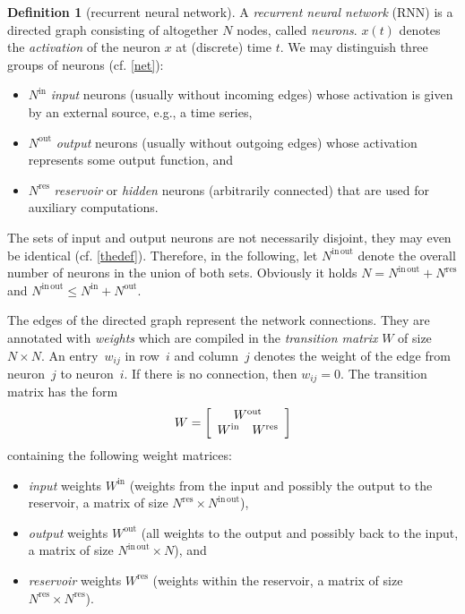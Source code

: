 \documentclass[twoside,11pt]{article}
\theoremstyle{definition}
\newtheorem{defn}{Definition}
\begin{document}
\begin{defn}[recurrent neural network]
A \emph{recurrent neural network} (RNN) is a directed graph consisting of
altogether $N$ nodes, called \emph{neurons}. $x(t)$ denotes the
\emph{activation} of the neuron $x$ at (discrete) time $t$. We may distinguish
three groups of neurons (cf. \cref{net}):
\begin{itemize}
  \item $N^\mathrm{in}$ \emph{input} neurons (usually without incoming edges)
	whose activation is given by an external source, e.g., a time series,
  \item $N^\mathrm{out}$ \emph{output} neurons (usually without outgoing edges)
	whose activation represents some output function, and
  \item $N^\mathrm{res}$ \emph{reservoir} or \emph{hidden} neurons (arbitrarily
	connected) that are used for auxiliary computations.
\end{itemize}
The sets of input and output neurons are not necessarily disjoint, they may even
be identical (cf. \cref{thedef}). Therefore, in the following, let
$N^\mathrm{in\,out}$ denote the overall number of neurons in the union of both
sets. Obviously it holds $N = N^\mathrm{in\,out}+N^\mathrm{res}$ and
$N^\mathrm{in\,out} \le N^\mathrm{in}+N^\mathrm{out}$.

The edges of the directed graph represent the network connections. They are
annotated with \emph{weights} which are compiled in the \emph{transition matrix}
$W$ of size $N \times N$. An entry~$w_{ij}$ in row~$i$ and column~$j$ denotes the weight of the edge
from neuron~$j$ to neuron~$i$. If there is no connection, then
$w_{ij} = 0$. The transition matrix has the form
\begin{equation}\label{matrix}
  W = \left[ \begin{array}{cc}
  \multicolumn{2}{c}{W^\mathrm{out}}\\
  W^\mathrm{in} & W^\mathrm{res}
\end{array} \right]
\end{equation}
containing the following weight matrices:
\begin{itemize}
  \item \emph{input} weights $W^\mathrm{in}$ (weights from the input and
	possibly the output to the reservoir, a matrix of size $N^\mathrm{res} \times N^\mathrm{in\,out}$),
  \item \emph{output} weights $W^\mathrm{out}$ (all weights to the output and
	possibly back to the input, a matrix of size $N^\mathrm{in\,out} \times N$), and
  \item \emph{reservoir} weights $W^\mathrm{res}$ (weights within the reservoir,
	a matrix of size $N^\mathrm{res} \times N^\mathrm{res}$).
\end{itemize}
\end{defn}
\end{document}
